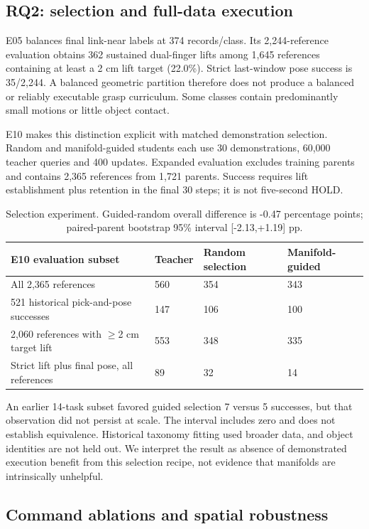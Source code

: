 \documentclass[10pt,twocolumn]{article}
\begin{document}
\subsection{RQ2: selection and full-data execution}

E05 balances final link-near labels at 374 records/class. Its 2,244-reference evaluation obtains 362 sustained dual-finger lifts among 1,645 references containing at least a 2 cm lift target (22.0\%). Strict last-window pose success is 35/2,244. A balanced geometric partition therefore does not produce a balanced or reliably executable grasp curriculum. Some classes contain predominantly small motions or little object contact.

E10 makes this distinction explicit with matched demonstration selection. Random and manifold-guided students each use 30 demonstrations, 60,000 teacher queries and 400 updates. Expanded evaluation excludes training parents and contains 2,365 references from 1,721 parents. Success requires lift establishment plus retention in the final 30 steps; it is not five-second HOLD.

\begin{table}[t]
\small
\begin{tabularx}{\textwidth}{@{}lXXX@{}}
\toprule
E10 evaluation subset & Teacher & Random selection & Manifold-guided \\
\midrule
All 2,365 references & 560 & 354 & 343 \\
521 historical pick-and-pose successes & 147 & 106 & 100 \\
2,060 references with $\geq$2 cm target lift & 553 & 348 & 335 \\
Strict lift plus final pose, all references & 89 & 32 & 14 \\
\bottomrule
\end{tabularx}
\caption{Selection experiment. Guided-random overall difference is -0.47 percentage points; paired-parent bootstrap 95\% interval [-2.13,+1.19] pp.}
\end{table}

An earlier 14-task subset favored guided selection 7 versus 5 successes, but that observation did not persist at scale. The interval includes zero and does not establish equivalence. Historical taxonomy fitting used broader data, and object identities are not held out. We interpret the result as absence of demonstrated execution benefit from this selection recipe, not evidence that manifolds are intrinsically unhelpful.

\subsection{Command ablations and spatial robustness}
\end{document}
